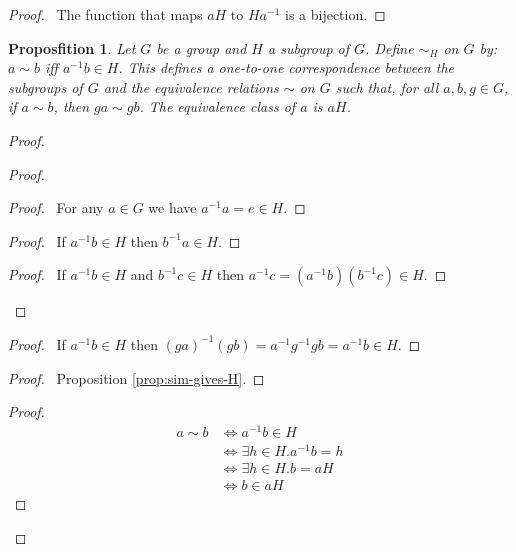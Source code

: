 \documentclass{book}
\let\qed\relax
\newtheorem{prop}{Proposfition}[chapter]
\theoremstyle{definition}
\newcommand{\inv}[1]{\ensuremath{{#1}^{-1}}}
\begin{document}
\begin{proof}
\pf\ The function that maps $aH$ to $H \inv{a}$ is a bijection. \qed
\end{proof}

\begin{prop}
Let $G$ be a group and $H$ a subgroup of $G$. Define $\sim_H$ on $G$ by: $a\sim b$ iff $\inv{a} b \in H$. This defines a one-to-one correspondence between the subgroups of $G$ and the equivalence relations $\sim$ on $G$ such that, for all $a,b,g \in G$, if $a \sim b$, then $ga \sim gb$. The equivalence class of $a$ is $aH$.
\end{prop}

\begin{proof}
\pf
{}
\begin{proof}
	\begin{proof}
		\pf\ For any $a \in G$ we have $\inv{a} a = e \in H$.
	\end{proof}
	\begin{proof}
		\pf\ If $\inv{a} b \in H$ then $\inv{b} a \in H$.
	\end{proof}
	\begin{proof}
		\pf\ If $\inv{a} b \in H$ and $\inv{b} c \in H$ then $\inv{a} c = (\inv{a} b) (\inv{b} c) \in H$.
	\end{proof}
\end{proof}
\begin{proof}
	\pf\ If $\inv{a} b \in H$ then $\inv{(ga)}(gb) = \inv{a} \inv{g} g b = \inv{a} b \in H$.
\end{proof}
\begin{proof}
	\pf\ Proposition \ref{prop:sim-gives-H}.
\end{proof}
\begin{proof}
	\pf
	\begin{align*}
		a \sim b & \Leftrightarrow \inv{a} b \in H \\
		& \Leftrightarrow \exists h \in H. \inv{a} b = h \\
		& \Leftrightarrow \exists h \in H. b = aH \\
		& \Leftrightarrow b \in aH
	\end{align*}
\end{proof}
\qed
\end{proof}
\end{document}

